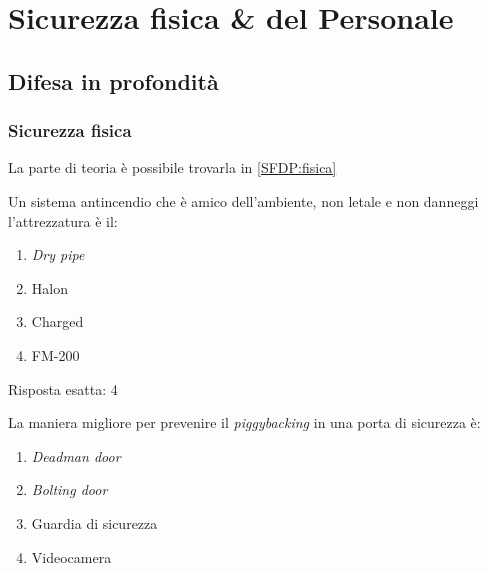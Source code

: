 \chapter{Sicurezza fisica \& del Personale}
\label{esSFDP}

\section{Difesa in profondità}

\subsection{Sicurezza fisica}
\label{esSFDP:fisica}

La parte di teoria è possibile trovarla in \ref{SFDP:fisica}


\begin{Exercise} [
  title={Quiz},
  label={esSFDP1}
  ]

  \Question Un sistema antincendio che è amico dell'ambiente, non letale e non 
danneggi l'attrezzatura è il:
\begin{enumerate}
 \item \textit{Dry pipe}
 \item Halon
 \item Charged
 \item FM-200
\end{enumerate}

\end{Exercise}


\begin{Answer} [
  ref={esSFDP1},
  number={1}
  ]

  \Question Risposta esatta: 4

\end{Answer}


\begin{Exercise} [
  title={Quiz},
  label={esSFDP2}
  ]

  \Question La maniera migliore per prevenire il \textit{piggybacking} in una 
porta di sicurezza è:
\begin{enumerate}
 \item \textit{Deadman door}
 \item \textit{Bolting door}
 \item Guardia di sicurezza
 \item Videocamera
\end{enumerate}

\end{Exercise}


